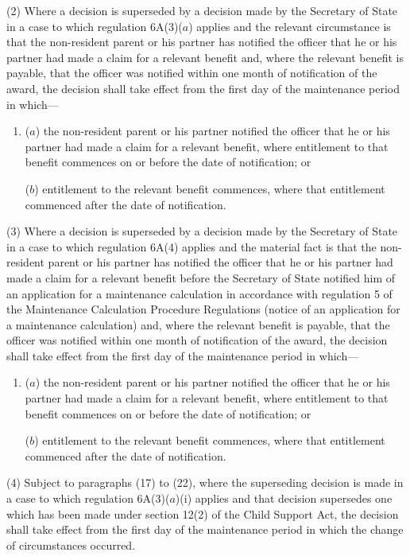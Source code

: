\documentclass[12pt,a4paper]{article}
\begin{document}
{(2) Where a decision is superseded by a decision made by the Secretary of State in a case to which regulation 6A(3)($a$)  applies and the relevant circumstance is that the non-resident parent or his partner has notified the officer that he or his partner had made a claim for a relevant benefit and, where the relevant benefit is payable, that the officer was notified within one month of notification of the award, the decision shall take effect from the first day of the maintenance period in which—
\begin{enumerate}\item[]
($a$) the non-resident parent or his partner notified the officer that he or his partner had made a claim for a relevant benefit, where entitlement to that benefit commences on or before the date of notification; or

($b$) entitlement to the relevant benefit commences, where that entitlement commenced after the date of notification.
\end{enumerate}

\pagebreak[3]

(3) Where a decision is superseded by a decision made by the Secretary of State in a case to which regulation 6A(4) applies and the material fact is that the non-resident parent or his partner has notified the officer that he or his partner had made a claim for a relevant benefit before the Secretary of State notified him of an application for a maintenance calculation in accordance with regulation 5 of the Maintenance Calculation Procedure Regulations (notice of an application for a maintenance calculation) and, where the relevant benefit is payable, that the officer was notified within one month of notification of the award, the decision shall take effect from the first day of the maintenance period in which—
\begin{enumerate}\item[]
($a$) the non-resident parent or his partner notified the officer that he or his partner had made a claim for a relevant benefit, where entitlement to that benefit commences on or before the date of notification; or

($b$) entitlement to the relevant benefit commences, where that entitlement commenced after the date of notification.
\end{enumerate}

(4) Subject to paragraphs (17) to (22), where the superseding decision is made in a case to which regulation 6A(3)($a$)(i)  applies and that decision supersedes one which has been made under section 12(2) of the Child Support Act, the decision shall take effect from the first day of the maintenance period in which the change of circumstances occurred.

}
\end{document}

